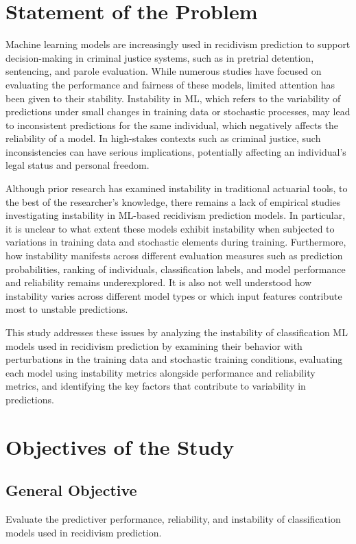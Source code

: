 \documentclass[12pt]{article}
\begin{document}
\section{Statement of the Problem} 
\tab%
Machine learning models are increasingly used in recidivism prediction to support decision-making in criminal justice systems, such as in pretrial detention, sentencing, and parole evaluation. While numerous studies have focused on evaluating the performance and fairness of these models, limited attention has been given to their stability. Instability in ML, which refers to the variability of predictions under small changes in training data or stochastic processes, may lead to inconsistent predictions for the same individual, which negatively affects the reliability of a model. In high-stakes contexts such as criminal justice, such inconsistencies can have serious implications, potentially affecting an individual's legal status and personal freedom. 

Although prior research has examined instability in traditional actuarial tools, to the best of the researcher's knowledge, there remains a lack of empirical studies investigating instability in ML-based recidivism prediction models. In particular, it is unclear to what extent these models exhibit instability when subjected to variations in training data and stochastic elements during training. Furthermore, how instability manifests across different evaluation measures such as prediction probabilities, ranking of individuals, classification labels, and model performance and reliability remains underexplored. It is also not well understood how instability varies across different model types or which input features contribute most to unstable predictions.

This study addresses these issues by analyzing the instability of  classification ML models used in recidivism prediction by examining their behavior with perturbations in the training data and stochastic training conditions, evaluating each model using instability metrics alongside performance and reliability metrics, and identifying the key factors that contribute to variability in predictions.

\section{Objectives of the Study} 
\subsection{General Objective} Evaluate the predictiver performance, reliability, and instability of classification models used in recidivism prediction.
\end{document}
